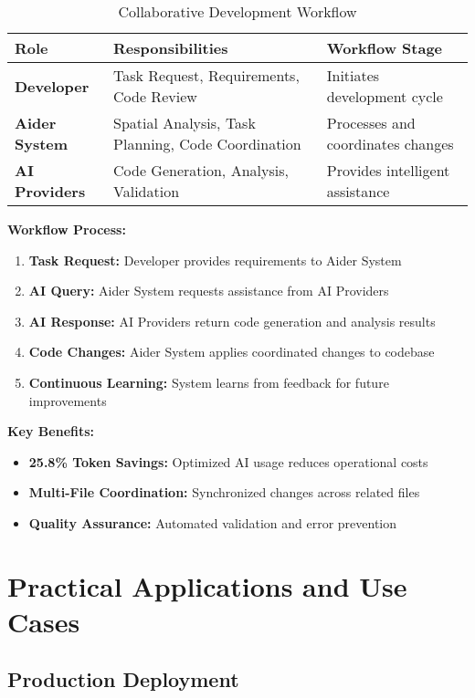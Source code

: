 \documentclass[12pt,a4paper]{article}
\begin{document}
\begin{table}[H]
\centering
\caption{Collaborative Development Workflow}
\begin{tabularx}{\textwidth}{|l|X|X|}
\hline
\textbf{Role} & \textbf{Responsibilities} & \textbf{Workflow Stage} \\
\hline
\textbf{Developer} & Task Request, Requirements, Code Review & Initiates development cycle \\
\hline
\textbf{Aider System} & Spatial Analysis, Task Planning, Code Coordination & Processes and coordinates changes \\
\hline
\textbf{AI Providers} & Code Generation, Analysis, Validation & Provides intelligent assistance \\
\hline
\end{tabularx}
\label{fig:workflow}
\end{table}

\textbf{Workflow Process:}
\begin{enumerate}
    \item \textbf{Task Request:} Developer provides requirements to Aider System
    \item \textbf{AI Query:} Aider System requests assistance from AI Providers
    \item \textbf{AI Response:} AI Providers return code generation and analysis results
    \item \textbf{Code Changes:} Aider System applies coordinated changes to codebase
    \item \textbf{Continuous Learning:} System learns from feedback for future improvements
\end{enumerate}

\textbf{Key Benefits:}
\begin{itemize}
    \item \textbf{25.8\% Token Savings:} Optimized AI usage reduces operational costs
    \item \textbf{Multi-File Coordination:} Synchronized changes across related files
    \item \textbf{Quality Assurance:} Automated validation and error prevention
\end{itemize}

\section{Practical Applications and Use Cases}

\subsection{Production Deployment}
\end{document}
